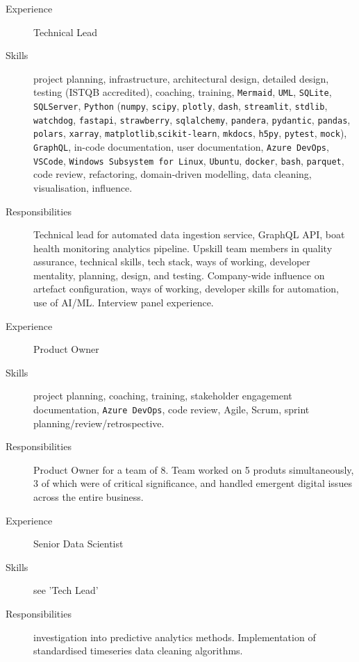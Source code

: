 \documentclass[margin,line]{resume}
\begin{document}
\begin{resume}
\begin{description}
		\item[Experience] Technical Lead
		\item[Skills] project planning, infrastructure, architectural design,
		      detailed design, testing (\textsc{ISTQB} accredited),
		      coaching, training, \texttt{Mermaid},
		      \texttt{UML}, \texttt{SQLite}, \texttt{SQLServer},
		      \texttt{Python} (\texttt{numpy}, \texttt{scipy},
		      \texttt{plotly}, \texttt{dash}, \texttt{streamlit},
		      \texttt{stdlib}, \texttt{watchdog}, \texttt{fastapi},
		      \texttt{strawberry}, \texttt{sqlalchemy}, \texttt{pandera},
		      \texttt{pydantic}, \texttt{pandas}, \texttt{polars},
		      \texttt{xarray}, \texttt{matplotlib},\linebreak\texttt{scikit-learn},
		      \texttt{mkdocs}, \texttt{h5py}, \texttt{pytest}, \texttt{mock}),
		      \texttt{GraphQL}, in-code documentation, user documentation,
		      \texttt{Azure DevOps}, \texttt{VSCode},
		      \texttt{Windows Subsystem for Linux}, \texttt{Ubuntu}, \texttt{docker}, \texttt{bash},
		      \texttt{parquet}, code review, refactoring, domain-driven modelling,
		      data cleaning, visualisation, influence.
		\item[Responsibilities] Technical lead for automated data ingestion
		      service, GraphQL API, boat health monitoring analytics pipeline.
		      Upskill team members in quality assurance, technical skills,
		      tech stack, ways of working, developer mentality, planning,
		      design, and testing.
		      Company-wide influence on artefact configuration, ways of working,
		      developer skills for automation, use of \textsc{AI}/\textsc{ML}.
		      Interview panel experience.

		\item[Experience] Product Owner
		\item[Skills] project planning, coaching, training, stakeholder engagement
		      documentation, \texttt{Azure DevOps}, code review,
		      Agile, Scrum, sprint planning/review/retrospective.
		\item[Responsibilities] Product Owner for a team of 8.
		      Team worked on 5 produts simultaneously, 3 of which were of critical significance,
		      and handled emergent digital issues across the entire business.

		\item[Experience] Senior Data Scientist
		\item[Skills] see 'Tech Lead'
		\item[Responsibilities] investigation into predictive analytics methods.
		      Implementation of standardised timeseries data cleaning algorithms.



\end{description}
\end{resume}
\end{document}

